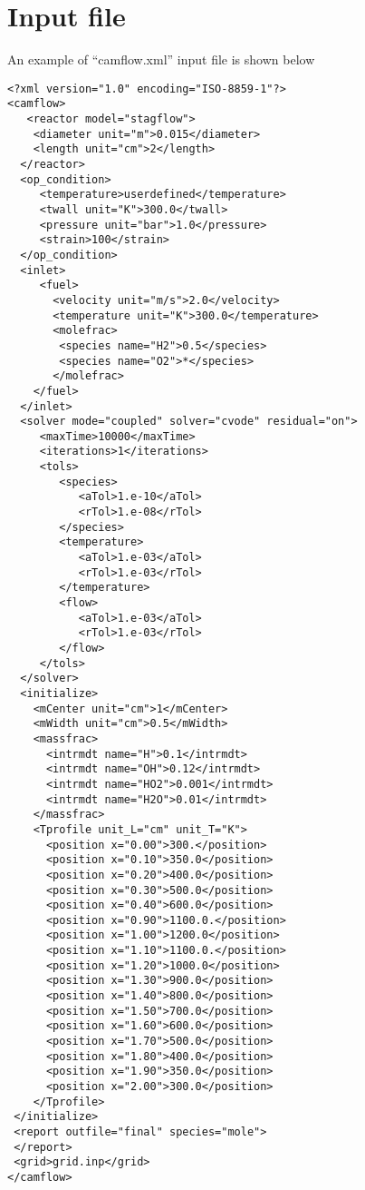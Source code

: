\section{Input file}
An example of ``camflow.xml'' input file is shown below
{\scriptsize{

\begin{verbatim}
<?xml version="1.0" encoding="ISO-8859-1"?>
<camflow>
   <reactor model="stagflow">
    <diameter unit="m">0.015</diameter>
    <length unit="cm">2</length>
  </reactor>
  <op_condition>
     <temperature>userdefined</temperature>
     <twall unit="K">300.0</twall>
     <pressure unit="bar">1.0</pressure>
     <strain>100</strain>
  </op_condition>
  <inlet>
     <fuel>
       <velocity unit="m/s">2.0</velocity>
       <temperature unit="K">300.0</temperature>
       <molefrac>
        <species name="H2">0.5</species>
        <species name="O2">*</species>
       </molefrac>
    </fuel>
  </inlet>
  <solver mode="coupled" solver="cvode" residual="on">
     <maxTime>10000</maxTime>
     <iterations>1</iterations>
     <tols>
        <species>
           <aTol>1.e-10</aTol>
           <rTol>1.e-08</rTol>
        </species>
        <temperature>
           <aTol>1.e-03</aTol>
           <rTol>1.e-03</rTol>
        </temperature>
        <flow>
           <aTol>1.e-03</aTol>
           <rTol>1.e-03</rTol>
        </flow>
     </tols>
  </solver>
  <initialize>
    <mCenter unit="cm">1</mCenter>
    <mWidth unit="cm">0.5</mWidth>
    <massfrac>
      <intrmdt name="H">0.1</intrmdt>
      <intrmdt name="OH">0.12</intrmdt>
      <intrmdt name="HO2">0.001</intrmdt>
      <intrmdt name="H2O">0.01</intrmdt>
    </massfrac>
    <Tprofile unit_L="cm" unit_T="K">
      <position x="0.00">300.</position>
      <position x="0.10">350.0</position>
      <position x="0.20">400.0</position>
      <position x="0.30">500.0</position>
      <position x="0.40">600.0</position>
      <position x="0.90">1100.0.</position>
      <position x="1.00">1200.0</position>
      <position x="1.10">1100.0.</position>
      <position x="1.20">1000.0</position>
      <position x="1.30">900.0</position>
      <position x="1.40">800.0</position>
      <position x="1.50">700.0</position>
      <position x="1.60">600.0</position>
      <position x="1.70">500.0</position>
      <position x="1.80">400.0</position>
      <position x="1.90">350.0</position>
      <position x="2.00">300.0</position>
    </Tprofile>
 </initialize>
 <report outfile="final" species="mole">
 </report>
 <grid>grid.inp</grid>
</camflow>

\end{verbatim}}
}

